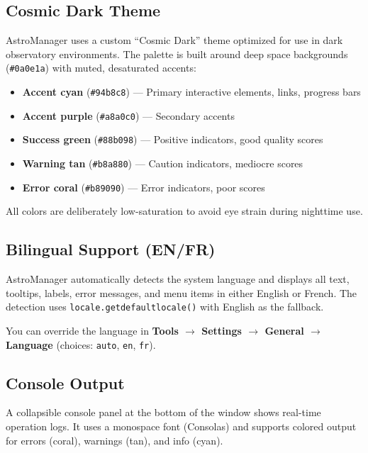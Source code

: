 \documentclass[11pt,a4paper]{article}
\begin{document}
\subsection{Cosmic Dark Theme}

AstroManager uses a custom ``Cosmic Dark'' theme optimized for use in dark observatory environments. The palette is built around deep space backgrounds (\texttt{\#0a0e1a}) with muted, desaturated accents:

\begin{itemize}
    \item \textbf{Accent cyan} (\texttt{\#94b8c8}) --- Primary interactive elements, links, progress bars
    \item \textbf{Accent purple} (\texttt{\#a8a0c0}) --- Secondary accents
    \item \textbf{Success green} (\texttt{\#88b098}) --- Positive indicators, good quality scores
    \item \textbf{Warning tan} (\texttt{\#b8a880}) --- Caution indicators, mediocre scores
    \item \textbf{Error coral} (\texttt{\#b89090}) --- Error indicators, poor scores
\end{itemize}

All colors are deliberately low-saturation to avoid eye strain during nighttime use.

\subsection{Bilingual Support (EN/FR)}

AstroManager automatically detects the system language and displays all text, tooltips, labels, error messages, and menu items in either English or French. The detection uses \texttt{locale.getdefaultlocale()} with English as the fallback.

You can override the language in \textbf{Tools $\rightarrow$ Settings $\rightarrow$ General $\rightarrow$ Language} (choices: \texttt{auto}, \texttt{en}, \texttt{fr}).

\subsection{Console Output}

A collapsible console panel at the bottom of the window shows real-time operation logs. It uses a monospace font (Consolas) and supports colored output for errors (coral), warnings (tan), and info (cyan).
\end{document}
